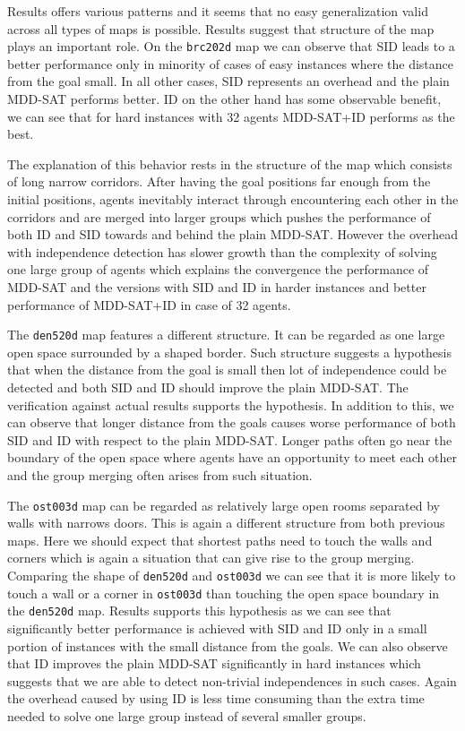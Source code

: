 \documentclass[jair,oneside,11pt]{article}
\begin{document}
Results offers various patterns and it seems that no easy generalization valid across all types of maps is possible. Results suggest that structure of the map plays an important role.
On the \texttt{brc202d} map we can observe that SID leads to a better performance only in minority of cases of easy instances where the distance from the goal small. In all other cases, SID represents an overhead and the plain MDD-SAT performs better. ID on the other hand has some observable benefit, we can see that for hard instances with 32 agents MDD-SAT+ID performs as the best.

The explanation of this behavior rests in the structure of the map which consists of long narrow corridors. After having the goal positions far enough from the initial positions, agents inevitably interact through encountering each other in the corridors and are merged into larger groups which pushes the performance of both ID and SID towards and behind the plain MDD-SAT. However the overhead with independence detection has slower growth than the complexity of solving one large group of agents which explains the convergence the performance of MDD-SAT and the versions with SID and ID in harder instances and better performance of MDD-SAT+ID in case of 32 agents.

The \texttt{den520d} map features a different structure. It can be regarded as one large open space surrounded by a shaped border. Such structure suggests a hypothesis that when the distance from the goal is small then lot of independence could be detected and both SID and ID should improve the plain MDD-SAT. The verification against actual results supports the hypothesis. In addition to this, we can observe that longer distance from the goals causes worse performance of both SID and ID with respect to the plain MDD-SAT. Longer paths often go near the boundary of the open space where agents have an opportunity to meet each other and the group merging often arises from such situation.

The \texttt{ost003d} map can be regarded as relatively large open rooms separated by walls with narrows doors. This is again a different structure from both previous maps. Here we should expect that shortest paths need to touch the walls and corners which is again a situation that can give rise to the group merging. Comparing the shape of \texttt{den520d} and \texttt{ost003d} we can see that it is more likely to touch a wall or a corner in \texttt{ost003d} than touching the open space boundary in the \texttt{den520d} map. Results supports this hypothesis as we can see that significantly better performance is achieved with SID and ID only in a small portion of instances with the small distance from the goals. We can also observe that ID improves the plain MDD-SAT significantly in hard instances which suggests that we are able to detect non-trivial independences in such cases. Again the overhead caused by using ID is less time consuming than the extra time needed to solve one large group instead of several smaller groups.
\end{document}
